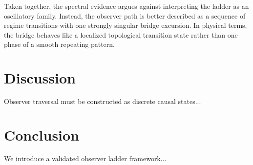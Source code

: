\documentclass[11pt]{article}
\begin{document}
Taken together, the spectral evidence argues against interpreting the ladder as an oscillatory family. Instead, the observer path is better described as a sequence of regime transitions with one strongly singular bridge excursion. In physical terms, the bridge behaves like a localized topological transition state rather than one phase of a smooth repeating pattern.

\section{Discussion}
Observer traversal must be constructed as discrete causal states...

\section{Conclusion}
We introduce a validated observer ladder framework...
\end{document}
